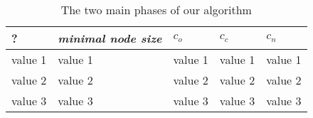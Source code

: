 \begin{table}[h]
    \begin{tabular}{| p{1.8cm} | p{1.8cm} || p{1.5cm} | p{1.5cm} | p{1.5cm} |}
    \hline
    ?	& \emph{minimal node size} & $c_o $ & $c_c$ & $c_n$ \\ \hline
    value 1 		& value 1 	& value 1 	& value 1	& value 1 \\ \hline
    value 2 		& value 2	& value 2 	& value 2	& value 2 \\ \hline
    value 3	 	& value 3	& value 3 	& value 3	& value 3 \\
    \hline
    \end{tabular}
    \caption{The two main phases of our algorithm}
	\label{tab_treeevaluation}
\end{table}

